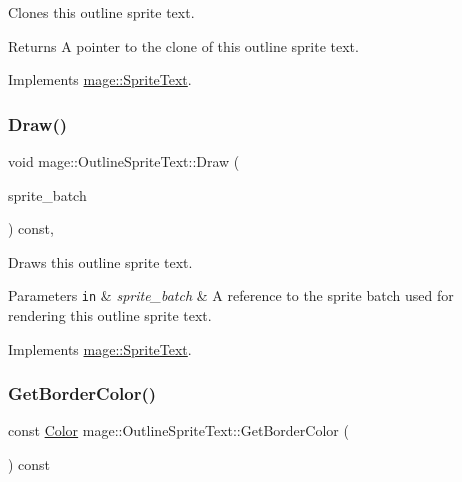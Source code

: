 Clones this outline sprite text.

\begin{DoxyReturn}{Returns}
A pointer to the clone of this outline sprite text. 
\end{DoxyReturn}


Implements \hyperlink{classmage_1_1_sprite_text_aa2c63346f5ad7f63f7a6d474df3556ef}{mage\+::\+Sprite\+Text}.

\hypertarget{classmage_1_1_outline_sprite_text_a524e9ad1caeeeaa32405e61d1a5e1032}{}\label{classmage_1_1_outline_sprite_text_a524e9ad1caeeeaa32405e61d1a5e1032} 
\subsubsection{\texorpdfstring{Draw()}{Draw()}}
{\footnotesize\ttfamily void mage\+::\+Outline\+Sprite\+Text\+::\+Draw (\begin{DoxyParamCaption}\item[{Sprite\+Batch \&}]{sprite\+\_\+batch }\end{DoxyParamCaption}) const\hspace{0.3cm}{\ttfamily [override]}, {\ttfamily [virtual]}}

Draws this outline sprite text.


\begin{DoxyParams}[1]{Parameters}
\mbox{\tt in}  & {\em sprite\+\_\+batch} & A reference to the sprite batch used for rendering this outline sprite text. \\
\hline
\end{DoxyParams}


Implements \hyperlink{classmage_1_1_sprite_text_a45d5ac8410d5a46b26e8491946a2ad9e}{mage\+::\+Sprite\+Text}.

\hypertarget{classmage_1_1_outline_sprite_text_adb4936119bcc0b148c9e11f021e83940}{}\label{classmage_1_1_outline_sprite_text_adb4936119bcc0b148c9e11f021e83940} 
\subsubsection{\texorpdfstring{Get\+Border\+Color()}{GetBorderColor()}}
{\footnotesize\ttfamily const \hyperlink{structmage_1_1_color}{Color} mage\+::\+Outline\+Sprite\+Text\+::\+Get\+Border\+Color (\begin{DoxyParamCaption}{ }\end{DoxyParamCaption}) const\hspace{0.3cm}{\ttfamily [noexcept]}}


